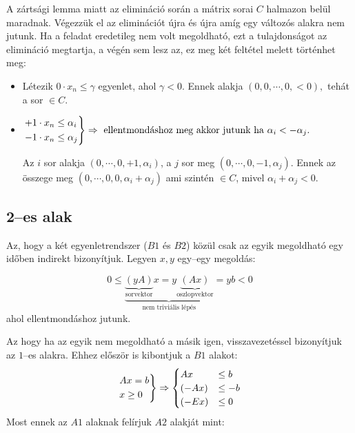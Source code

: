 A zártsági lemma miatt az elimináció során a mátrix sorai $C$ halmazon belül
maradnak. Végezzük el az eliminációt újra és újra amíg egy változós alakra nem
jutunk. Ha a feladat eredetileg nem volt megoldható, ezt a tulajdonságot az
elimináció megtartja, a végén sem lesz az, ez meg két feltétel melett történhet meg:

\begin{itemize}
  \item Létezik $0 \cdot x_n \leq \gamma$ egyenlet, ahol $\gamma < 0$. Ennek alakja 
  $(0,0, \cdots, 0, <0),$ tehát a sor $\in C$.
  \item $\begin{rcases}
  +1 \cdot x_n \leq \alpha_i \\ 
  -1 \cdot x_n \leq \alpha_j \\
  \end{rcases} \Rightarrow  \mbox{ ellentmondáshoz meg akkor jutunk ha }
  \alpha_i < -\alpha_j.$
  
  Az $i$ sor alakja $(0, \cdots, 0, +1, \alpha_i)$, a $j$ sor meg $(0, \cdots,
  0, -1, \alpha_j)$. Ennek az összege meg $(0, \cdots, 0, 0, \alpha_i+\alpha_j)$
  ami szintén $\in C$, mivel $\alpha_i+\alpha_j<0$.
\end{itemize}

\subsection{2--es alak}

Az, hogy a két egyenletrendszer ($B1$ és $B2$) közül csak az egyik megoldható
egy időben indirekt bizonyítjuk. Legyen $x,y$ egy--egy megoldás:

\[ 0 \leq \underbrace{
		   \underbrace{(yA)}_{\mbox{sorvektor}}x = 
		  y\underbrace{(Ax)}_{\mbox{oszlopvektor}}}
		  _{\mbox{nem triviális lépés}}=yb<0\] ahol ellentmondáshoz jutunk.

Az hogy ha az egyik nem megoldható a másik igen, visszavezetéssel bizonyítjuk az
$1$--es alakra. Ehhez először is kibontjuk a $B1$ alakot:
\[ 
\begin{rcases}
Ax =b \\
x \geq 0
\end{rcases} \Rightarrow
\begin{cases}
A x    &\leq b \\
(-A x) &\leq -b \\
(-E x) &\leq 0
\end{cases}
\]
Most ennek az $A1$ alaknak felírjuk $A2$ alakját mint: 

